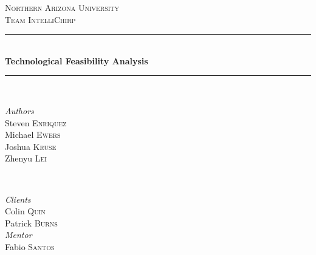 \documentclass[12pt,journal,compsoc]{IEEEtran}
\begin{document}
\begin{titlepage} %
	\newcommand{\HRule}{\rule{\linewidth}{0.5mm}} %
	
	\center %
	
	
	\textsc{\LARGE Northern Arizona University}\\[1.5cm] %
	
	\textsc{\Large Team IntelliChirp}\\[0.5cm] %
	
	
	
	\HRule\\[1cm]
	
	{\huge\bfseries Technological Feasibility Analysis}\\[0.4cm] %
	
	\HRule\\[1.4cm]
	
	
	\begin{minipage}{0.4\textwidth}
		\begin{flushleft}
			\large
			\textit{Authors}\\
			Steven \textsc{Enriquez}\\
			Michael \textsc{Ewers}\\
			Joshua \textsc{Kruse}\\
			Zhenyu \textsc{Lei}
		\end{flushleft}
	\end{minipage}
	~
	\begin{minipage}{0.4\textwidth}
		\begin{flushright}
			\large
			\textit{Clients}\\
			Colin \textsc{Quin}\\
			Patrick \textsc{Burns}\\
			\textit{Mentor}\\
			Fabio \textsc{Santos}
		\end{flushright}
	\end{minipage}
	

\end{titlepage}
\end{document}

